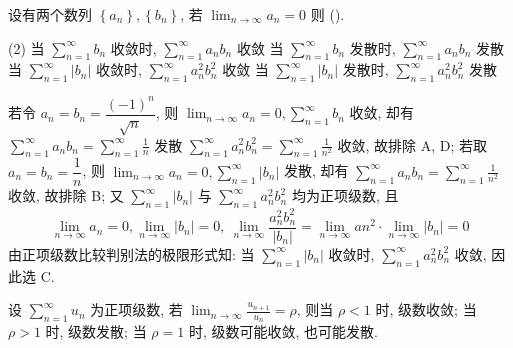 \begin{example}[2009 数一]
    设有两个数列 $ \left\{a_{n}\right\},\left\{b_{n}\right\}$, 若 $\displaystyle \lim _{n \to \infty} a_{n}=0 $ 则 (\quad).
    \begin{tasks}(2)
        \task 当 $\displaystyle \sum_{n=1}^{\infty} b_{n} $ 收敛时, $\displaystyle \sum_{n=1}^{\infty} a_{n} b_{n} $ 收敛
        \task 当 $\displaystyle \sum_{n=1}^{\infty} b_{n} $ 发散时, $\displaystyle \sum_{n=1}^{\infty} a_{n} b_{n} $ 发散
        \task 当 $\displaystyle \sum_{n=1}^{\infty}\left|b_{n}\right| $ 收敛时, $\displaystyle \sum_{n=1}^{\infty} a_{n}^{2} b_{n}^{2} $ 收敛
        \task 当 $\displaystyle \sum_{n=1}^{\infty}\left|b_{n}\right| $ 发散时, $\displaystyle \sum_{n=1}^{\infty} a_{n}^{2} b_{n}^{2} $ 发散
    \end{tasks}
\end{example}
\begin{solution}
    若令 $ a_{n}=b_{n}=\dfrac{(-1)^{n}}{\sqrt{n}}$, 则 $\displaystyle \lim _{n \to \infty} a_{n}=0, \sum_{n=1}^{\infty} b_{n} $ 收敛,
    却有 $\displaystyle  \sum_{n=1}^{\infty} a_{n} b_{n}=\sum_{n=1}^{\infty} \frac{1}{n} $ 发散 $\displaystyle \sum_{n=1}^{\infty} a_{n}^{2} b_{n}^{2}=\sum_{n=1}^{\infty} \frac{1}{n^{2}} $ 收敛,
    故排除 A, D;
    若取 $ a_{n}=b_{n}=\dfrac{1}{n} $, 则 $\displaystyle  \lim _{n \to \infty} a_{n}=0, \sum_{n=1}^{\infty}\left|b_{n}\right| $ 发散,
    却有 $\displaystyle \sum_{n=1}^{\infty} a_{n} b_{n}=\sum_{n=1}^{\infty} \frac{1}{n^{2}} $ 收敛, 故排除 B;
    又 $\displaystyle \sum_{n=1}^{\infty}\left|b_{n}\right| $ 与 $\displaystyle \sum_{n=1}^{\infty} a_{n}^{2} b_{n}^{2} $ 均为正项级数, 且
    $$\displaystyle\lim _{n \to \infty} a_{n}=0, \lim _{n \to \infty}\left|b_{n}\right|=0 ,~\lim_{n\to\infty}\dfrac{a_n^2b_n^2}{|b_n|}=\lim_{n\to\infty}an^2\cdot\lim_{n\to\infty}|b_n|=0$$
    由正项级数比较判别法的极限形式知: 当 $\displaystyle\sum_{n=1}^{\infty}|b_n|$ 收敛时, $\displaystyle\sum_{n=1}^{\infty}a_n^2b_n^2$ 收敛, 因此选 C.
\end{solution}

\begin{theorem}[比值审敛法]
    设 $\displaystyle  \sum_{n=1}^{\infty} u_{n} $ 为正项级数, 若 $\displaystyle  \lim _{n \to \infty} \frac{u_{n+1}}{u_{n}}=\rho $, 则当 $ \rho<1 $ 时, 级数收敛;
    当 $ \rho>1 $ 时, 级数发散; 当 $ \rho=1 $ 时, 级数可能收敛, 也可能发散.
\end{theorem}


